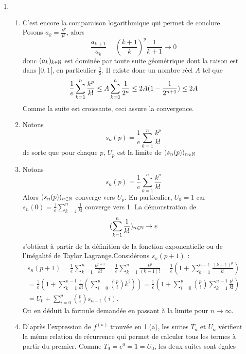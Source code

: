 \begin{enumerate}
\begin{enumerate}
l'ordre $n$ que l'on majore avec l'in{\'e}galit{\'e} de Lagrange
$$|f(x)-s_{n}(x)|\leq \frac{|x|^{n+1}}{(n+1)!}M_{n+1}(x)$$
o{\`u} $M_{n+1}$ est le borne sup{\'e}rieure de $f^{(n+1)}$ sur l'intervalle d'extr{\'e}mit{\'e}s 0 et $x$. On majore $M_{n+1}$ avec 1.(b):
$$|f(x)-s_{n}(x)|\leq \frac{|x|^{n+1}}{(n+1)!}2e (n+1)^{n+1}=2ea_{n+1}$$
et le th{\'e}or{\`e}me d'encadrement montre avec 2.(a) la convergence de $(s_n(x))_{n\in \N}$ vers $f(x)$
\end{enumerate}
%
\item \begin{enumerate}
     \item C'est encore la comparaison logarithmique qui permet de conclure. Posons $a_{k}=\frac{k^{p}}{p!}$, alors
$$\frac{a_{k+1}}{a_{k}}=\left(\frac{k+1}{k}\right)^{p}\frac{1}{k+1} \rightarrow 0$$
donc $(a_k)_{k\in \mathbb{N}}$ est domin{\'e}e par toute suite g{\'e}om{\'e}trique dont la raison est dans $]0,1[$, en particulier $\frac{1}{2}$. Il existe donc un nombre r{\'e}el $A$ tel que
$$\frac{1}{e}\sum_{k=1}^{n}\frac{k^{p}}{k !} \leq A \sum_{k=0}^{n}\frac{1}{2^{n}}\\
\leq 2A(1-\frac{1}{2^{n+1}})\leq 2A$$
Comme la suite est croissante, ceci assure la convergence.
     \item Notons
$$ s_{n}(p)= \frac{1}{e}\sum_{k=1}^{n}\frac{k^{p}}{k !}$$ de sorte que pour chaque $p$, $U_{p}$ est
 la limite de $(s_{n}(p))_{n\in \mathbb{N}}$
     \item Notons
$$s_{n}(p)=\frac{1}{e}\sum_{k=1}^{n}\frac{k^{p}}{k!}$$
Alors $(s_{n}(p))_{n\in \mathbb{N}}$ converge vers $U_{p}$. En particulier, $U_{0}=1$ car
$s_{n}(0)=\frac{1}{e}\sum_{k=1}^{n}\frac{1}{k!}$ converge vers 1. La d{\'e}monstration de
$$(\sum_{k=1}^{n}\frac{1}{k!})_{n\in \mathbb{N}}\rightarrow e$$
s'obtient {\`a} partir de la d{\'e}finition de la fonction exponentielle
ou de l'in{\'e}galit{\'e} de Taylor Lagrange.\newline Consid{\'e}rons
$s_{n}(p+1)$ :
\begin{multline*}
s_{n}(p+1) = \frac{1}{e}\sum_{k=1}^{n}\frac{k^{p+1}}{k!}= \frac{1}{e}\sum_{k=1}^{n}\frac{k^{p}}{(k-1)!} 
 = \frac{1}{e}\left(1+\sum_{k=1}^{n-1}\frac{(k+1)^{p}}{k!}\right)\\
 = \frac{1}{e}\left(1+\sum_{k=1}^{n-1}\frac{1}{k!}\left(\sum_{i=0}^{p} \binom{p}{i}k^{i}\right)\right) 
 = \frac{1}{e}\left(1+\sum_{i=0}^{p} \binom{p}{i} \sum_{k=1}^{n-1}\frac{ k^{i}}{k!} \right)\\
 = U_{0}+\sum_{i=0}^{p} \binom{p}{i} s_{n-1}(i).
\end{multline*}
On en d{\'e}duit la formule demand{\'e}e en passant {\`a} la limite pour
$n\rightarrow \infty$.
\item D'apr{\`e}s l'expression de $f^{(n)}$ trouv{\'e}e en 1.(a), les suites $T_{n}$ et $U_{n}$ v{\'e}rifient la m{\^e}me relation de r{\'e}currence qui permet de calculer tous les termes {\`a} partir du premier. Comme $T_{0}=e^{0}=1=U_{0}$, les deux suites sont {\'e}gales \end{enumerate}

\end{enumerate}

